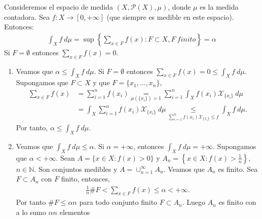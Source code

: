 \begin{ejemplo}
    Consideremos el espacio de medida $(X,\mathcal{P}(X),\mu)$, donde $\mu$ es la medida contadora. Sea $f: X \longrightarrow [0,+\infty]$ (que siempre es medible en este espacio). Entonces:
    \begin{align*}
        \int_{X}{f \ d\mu} = \sup{\left\{ \sum_{x \in F}{f(x)} : F \subset X, F \ finito \right\}} = \alpha
    \end{align*}
    Si $F = \emptyset$ entonces $\sum_{x \in F}{f(x)} = 0$.
    \begin{enumerate}
        \item Veamos que $\alpha \leq \int_{X}{f \ d\mu}$. Si $F = \emptyset$ entonces $\sum_{x \in F}{f(x)} = 0 \leq \int_{X}{f \ d\mu}$. Supongamos que $F \subset X$ y que $F = \{ x_1,...,x_n\}$,
              \begin{align*}
                  \sum_{x \in F}{f(x)} & = \sum_{i = 1}^{n}{f(x_i)} \underset{\mu(\{x_i\}) = 1}{=} \sum_{i=1}^{n}{\int_{X}{f(x_i)\mathcal{X}_{\{x_i\}} \ d\mu}}                                 \\
                                       & =\int_{X}{\sum_{i=1}^{n}{f(x_i)\mathcal{X}_{\{x_i\}}} \ d\mu} \underset{\sum_{i=1}^{n}{f(x_i)\mathcal{X}_{\{x_i\}}} \leq f}{ \leq} \int_{X}{f \ d\mu}.
              \end{align*}
              Por tanto, $\alpha \leq \int_{X}{f \ d\mu}$.
        \item Veamos que $\int_{X}{f \ d\mu} \leq \alpha$. Si $\alpha = +\infty$, entonces $\int_{X}{f \ d\mu} = +\infty$. Supongamos que $\alpha < +\infty$. Sean $A = \{x \in X : f(x) >0\}$ y $A_n = \left\{ x \in X : f(x) > \frac{1}{n}\right\}$, $n \in \mathbb{N}$. Son conjuntos medibles y $A = \cup_{n=1}^{\infty}{A_n}$. Veamos que $A_n$ es finito. Sea $F \subset A_n$ con $F$ finito, entonces,
              \begin{align*}
                  \frac{1}{n}\#F < \sum_{x \in F}{f(x)} \leq \alpha < +\infty.
              \end{align*}
              Por tanto $\#F \leq \alpha n$ para todo conjunto finito $F \subset A_n$. Luego $A_n$ es finito con a lo sumo $\alpha n$ elementos


\end{enumerate}
\end{ejemplo}
